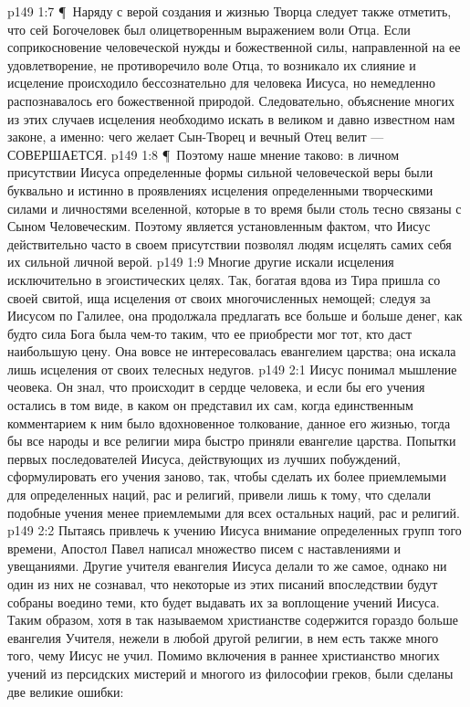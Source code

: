 \vs p149 1:7 \P\ \bibnobreakspace Наряду с верой создания и жизнью Творца следует также отметить, что сей Богочеловек был олицетворенным выражением воли Отца. Если соприкосновение человеческой нужды и божественной силы, направленной на ее удовлетворение, не противоречило воле Отца, то возникало их слияние и исцеление происходило бессознательно для человека Иисуса, но немедленно распознавалось его божественной природой. Следовательно, объяснение многих из этих случаев исцеления необходимо искать в великом и давно известном нам законе, а именно: чего желает Сын\hyp{}Творец и вечный Отец велит --- СОВЕРШАЕТСЯ.
\vs p149 1:8 \P\ Поэтому наше мнение таково: в личном присутствии Иисуса определенные формы сильной человеческой веры были буквально и истинно  в проявлениях исцеления определенными творческими силами и личностями вселенной, которые в то время были столь тесно связаны с Сыном Человеческим. Поэтому является установленным фактом, что Иисус действительно часто в своем присутствии позволял людям исцелять самих себя их сильной личной верой.
\vs p149 1:9 Многие другие искали исцеления исключительно в эгоистических целях. Так, богатая вдова из Тира пришла со своей свитой, ища исцеления от своих многочисленных немощей; следуя за Иисусом по Галилее, она продолжала предлагать все больше и больше денег, как будто сила Бога была чем\hyp{}то таким, что ее приобрести мог тот, кто даст наибольшую цену. Она вовсе не интересовалась евангелием царства; она искала лишь исцеления от своих телесных недугов.
\vs p149 2:1 Иисус понимал мышление чеовека. Он знал, что происходит в сердце человека, и если бы его учения остались в том виде, в каком он представил их сам, когда единственным комментарием к ним было вдохновенное толкование, данное его жизнью, тогда бы все народы и все религии мира быстро приняли евангелие царства. Попытки первых последователей Иисуса, действующих из лучших побуждений, сформулировать его учения заново, так, чтобы сделать их более приемлемыми для определенных наций, рас и религий, привели лишь к тому, что сделали подобные учения менее приемлемыми для всех остальных наций, рас и религий.
\vs p149 2:2 Пытаясь привлечь к учению Иисуса внимание определенных групп того времени, Апостол Павел написал множество писем с наставлениями и увещаниями. Другие учителя евангелия Иисуса делали то же самое, однако ни один из них не сознавал, что некоторые из этих писаний впоследствии будут собраны воедино теми, кто будет выдавать их за воплощение учений Иисуса. Таким образом, хотя в так называемом христианстве содержится гораздо больше евангелия Учителя, нежели в любой другой религии, в нем есть также много того, чему Иисус не учил. Помимо включения в раннее христианство многих учений из персидских мистерий и многого из философии греков, были сделаны две великие ошибки:
